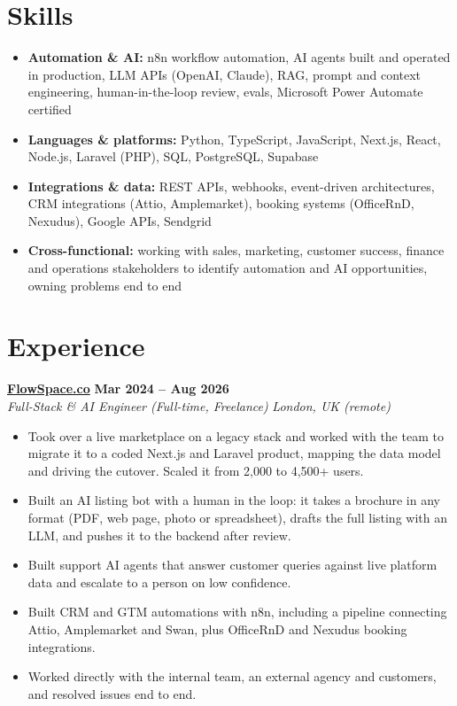 \documentclass[a4paper,10pt]{article}
\newcommand{\role}[4]{%
 \textbf{#1} \hfill \textbf{#2}\\[1pt]%
 \textit{#3} \hfill \textit{#4}\\[2pt]%
}
\begin{document}
\section{Skills}
\begin{itemize}
 \item \textbf{Automation \& AI:} n8n workflow automation, AI agents built and operated in production, LLM APIs (OpenAI, Claude), RAG, prompt and context engineering, human-in-the-loop review, evals, Microsoft Power Automate certified
 \item \textbf{Languages \& platforms:} Python, TypeScript, JavaScript, Next.js, React, Node.js, Laravel (PHP), SQL, PostgreSQL, Supabase
 \item \textbf{Integrations \& data:} REST APIs, webhooks, event-driven architectures, CRM integrations (Attio, Amplemarket), booking systems (OfficeRnD, Nexudus), Google APIs, Sendgrid
 \item \textbf{Cross-functional:} working with sales, marketing, customer success, finance and operations stakeholders to identify automation and AI opportunities, owning problems end to end
\end{itemize}

\section{Experience}

\role{\href{https://flowspace.co}{FlowSpace.co}}{Mar 2024 -- Aug 2026}{Full-Stack \& AI Engineer (Full-time, Freelance)}{London, UK (remote)}
\begin{itemize}
 \item Took over a live marketplace on a legacy stack and worked with the team to migrate it to a coded Next.js and Laravel product, mapping the data model and driving the cutover. Scaled it from 2,000 to 4,500+ users.
 \item Built an AI listing bot with a human in the loop: it takes a brochure in any format (PDF, web page, photo or spreadsheet), drafts the full listing with an LLM, and pushes it to the backend after review.
 \item Built support AI agents that answer customer queries against live platform data and escalate to a person on low confidence.
 \item Built CRM and GTM automations with n8n, including a pipeline connecting Attio, Amplemarket and Swan, plus OfficeRnD and Nexudus booking integrations.
 \item Worked directly with the internal team, an external agency and customers, and resolved issues end to end.
\end{itemize}
\end{document}

